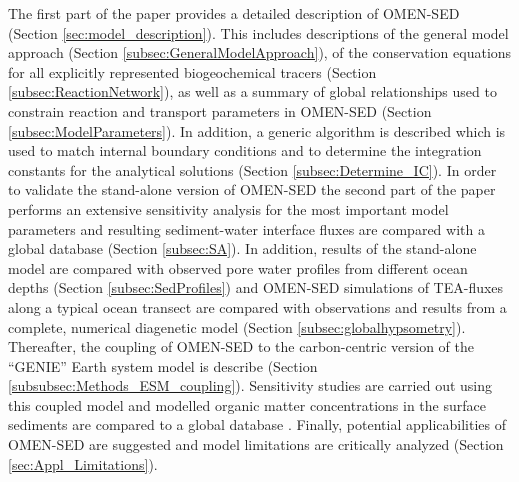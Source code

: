 \documentclass[gmd, manuscript]{copernicus}
\begin{document}
The first part of the paper provides a detailed description of OMEN-SED (Section \ref{sec:model_description}). This includes descriptions of the general model approach (Section \ref{subsec:GeneralModelApproach}), 
of the conservation equations for all explicitly represented biogeochemical tracers (Section \ref{subsec:ReactionNetwork}), as well as a summary of global relationships 
used to constrain reaction and transport parameters in OMEN-SED (Section \ref{subsec:ModelParameters}). 
In addition, a generic algorithm is described which is used to match internal boundary conditions and to determine the integration constants for the analytical solutions 
(Section \ref{subsec:Determine_IC}). 
In order to validate the stand-alone version of OMEN-SED the second part of the paper performs an extensive sensitivity analysis for the most important model parameters and 
resulting sediment-water interface fluxes are compared with a global database (Section \ref{subsec:SA}). 
In addition, results of the stand-alone model are compared with observed pore water profiles from different ocean depths (Section \ref{subsec:SedProfiles}) and OMEN-SED 
simulations of TEA-fluxes along a typical ocean transect are compared with observations and results from a complete, numerical diagenetic model (Section \ref{subsec:globalhypsometry}). 
Thereafter, the coupling of OMEN-SED to the carbon-centric version of the ``GENIE'' Earth system model \citep[cGENIE,][]{ridgwell_marine_2007} is describe (Section \ref{subsubsec:Methods_ESM_coupling}). 
Sensitivity studies are carried out using this coupled model and modelled organic matter concentrations in the surface sediments are compared to a global database \citep[][Section \ref{subsec:Parameterising_OM_rate_const}]{seiter_organic_2004}. 
Finally, potential applicabilities of OMEN-SED are suggested and model limitations are critically analyzed (Section \ref{sec:Appl_Limitations}).


\end{document}
